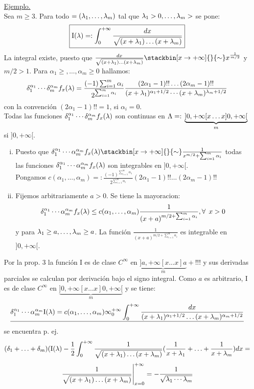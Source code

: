 \underline{Ejemplo.}\\
Sea $m \geq 3.$ Para todo \lam$=(\lambda_1,\ldots,\lambda_m)$ tal que $\lambda_1>0,\ldots, \lambda_m>$ se pone:
\begin{equation*}
\boxed{\mathrm{I}(\lambda)=:\int_0^{+\infty}\frac{dx}{\sqrt{(x+\lambda_1)\ldots (x+\lambda_m)}}}
\end{equation*}
La integral existe, puesto que $\frac{dx}{\sqrt{(x+\lam_1)\ldots (x+\lam_m)}} \stackbin[x \to +\infty]{} {\sim} x^{\frac{1}{m/2}}$ y $m/2>1$. Para $\alpha_1 \geq , \ldots, \alpha_m \geq 0$ hallamos:\\
$$
\delta_1^{\alpha_1}\cdots \delta_m^{\alpha_m}f_x(\lambda)=\frac{(-1)\sum_{i=1}^{m}\alpha_i}{2^{\sum_{i=1}^{m}\alpha_i}}\frac{(2\alpha_1-1)!! \ldots (2\alpha_m-1)!!}{(x+\lambda_1)^{\alpha_1+1/2}\cdots (x+\lambda_m)^{\lambda_m+1/2}}
$$
con la convención $(2\alpha_1-1)!!=1$, si $\alpha_i=0$.\\
Todas las funciones \lam \flecha $\delta_{1}^{\alpha_1}\cdots \delta_m^{\alpha_m}f_x(\lambda)$ son continuas en $\Lambda =: \phantom{}\underbrace{]0,+\infty [x\ldots x]0,+\infty[}_m$ si \x \en $]0,+\infty[$. 
\begin{enumerate}[i)]
\item Puesto que $\delta_1^{\alpha_1}\cdots \alpha_m^{\alpha_m}f_x(\lam)\stackbin[x \to +\infty]{}{\sim} \frac{1}{x^{m/2}+\sum_{i=1}^{m}\alpha_i}$ todas las funciones \x \flecha $\delta_1^{\alpha_1}\cdots \alpha_m^{\alpha_m}f_x(\lambda)$ son integrables en $]0,+\infty[$.\\
Pongamos $c(\alpha_1,\ldots,\alpha_m)=:\frac{(-1)^{\sum_{i=1}^{m}\alpha_1}}{2^{\sum_{i=1}^{m}\alpha_i}}(2\alpha_1-1)!! \ldots (2\alpha_m-1)!!$
\item Fijemos arbitrariamente $a>0$. Se tiene la mayoracion:\\
\begin{equation}
\delta_1^{\alpha_1}\cdots \alpha_m^{\alpha_m}f_x(\lambda) \leq c(\alpha_1,\ldots,\alpha_m) \frac{1}{(x+a)^{m/2+\sum_{i=1}^{m}\alpha_i}}, \forall \phantom{s} x>0
\end{equation}
y para $\lambda_1 \geq a, \ldots , \lambda_m \geq a$. La función \x \flecha $\frac{1}{(x+a)^{m/2+\sum_{i=1}^{m}\alpha_i}}$ es integrable en $]0,+\infty[$.\\
\end{enumerate}
Por la prop. 3 la función $\mathrm{I}$ es de clase $C^{\infty}$ en $\underbrace{]a,+\infty [x \ldots x]a}_m+!!!$ y sus derivadas parciales se calculan por derivación bajo el signo integral. Como $a$ es arbitrario, $\mathrm{I}$ es de clase $C^{\infty}$ en $\underbrace{]0,+\infty [x\ldots x]0,+\infty[}_m$ y se tiene:\\
$$
\underline{\delta_1^{\alpha_1}\cdots \alpha_m^{\alpha_m}\mathrm{I}(\lambda)=c(\alpha_1,\ldots,\alpha_m)\infty_0^{+\infty}\int_0^{+\infty}\frac{dx}{(x+\lambda_1)^{\alpha_1+1/2}\ldots (x+\lambda_m)^{\alpha_m+1/2}}}$$ 
se encuentra p. ej.\\
$$
(\delta_1+\ldots+\delta_m)(\mathrm{I}(\lambda)-\frac{1}{2}\int_0^{+\infty}\frac{1}{\sqrt{(x+\lambda_1)\ldots (x+\lambda_m)}}(\frac{1}{x+\lambda_1}+\ldots+\frac{1}{x+\lambda_m})dx=
$$
$$
\left.  \frac{1}{\sqrt{(x+\lambda_1)\ldots (x+\lambda_m)}} \right|_{x=0}^{+\infty}=-\frac{1}{\sqrt{\lambda_1 \cdots \lambda_m}}
$$

